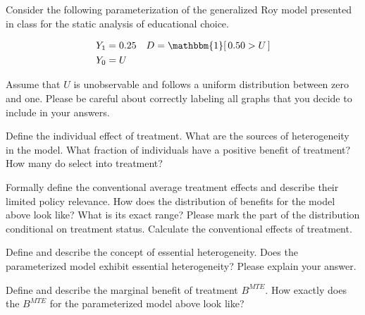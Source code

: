 Consider the following parameterization of the generalized Roy model presented in class for the static analysis of educational choice.

\begin{align*}
Y_1 & = 0.25     & D = \mathbbm{1}[\,0.50 > U\,] \\
Y_0 & = U &
\end{align*}

Assume that $U$ is unobservable and follows a uniform distribution between zero and one. Please be careful about correctly labeling all graphs that you decide to include in your answers.

\begin{boenumerate}

\item Define the individual effect of treatment. What are the sources of heterogeneity in the model. What fraction of individuals have a positive benefit of treatment?  How many do select into treatment?

\item Formally define the conventional average treatment effects and describe their limited policy relevance. How does the distribution of benefits for the model above look like? What is its exact range? Please mark the part of the distribution conditional on treatment status. Calculate the conventional effects of treatment.

\item Define and describe the concept of essential heterogeneity. Does the parameterized model exhibit essential heterogeneity? Please explain your answer.

\item Define and describe the marginal benefit of treatment $B^{MTE}$. How exactly does the $B^{MTE}$ for the parameterized model above look like?

\end{boenumerate}
